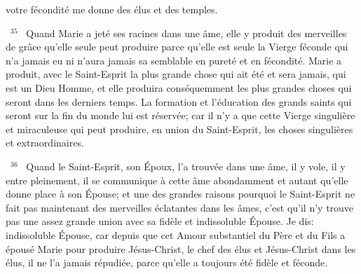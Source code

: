 \documentclass[paper=a5,pagesize=pdftex,fontsize=15pt,headinclude=on,twoside=off]{scrbook}
\newcommand{\negphantom}[1]{\settowidth{\dimen0}{#1}\hspace*{-\dimen0}}
\newcommand{\versenb}[1]{\par \vspace{10pt}~\negphantom{~${}^{#1}$~}${}^{#1}$~}
\begin{document}
votre fécondité me donne des élus et des temples.
\versenb{35} Quand Marie a jeté ses racines dans une âme, elle y produit des merveilles de grâce qu'elle seule peut
produire parce qu'elle est seule la Vierge féconde qui n'a jamais eu ni n'aura jamais sa semblable en pureté et en
fécondité.
Marie a produit, avec le Saint-Esprit la plus grande chose qui ait été et sera jamais, qui est un Dieu Homme, et elle
produira conséquemment les plus grandes choses qui seront dans les derniers temps. La formation et l'éducation
des grands saints qui seront sur la fin du monde lui est réservée; car il n'y a que cette Vierge singulière et
miraculeuse qui peut produire, en union du Saint-Esprit, les choses singulières et extraordinaires.
\versenb{36} Quand le Saint-Esprit, son Époux, l'a trouvée dans une âme, il y vole, il y entre pleinement, il se communique
à cette âme abondamment et autant qu'elle donne place à son Épouse; et une des grandes raisons pourquoi le
Saint-Esprit ne fait pas maintenant des merveilles éclatantes dans les âmes, c'est qu'il n'y trouve pas une assez
grande union avec sa fidèle et indissoluble Épouse. Je dis: indissoluble Épouse, car depuis que cet Amour
substantiel du Père et du Fils a épousé Marie pour produire Jésus-Christ, le chef des élus et Jésus-Christ dans les
élus, il ne l'a jamais répudiée, parce qu'elle a toujours été fidèle et féconde.
\end{document}
